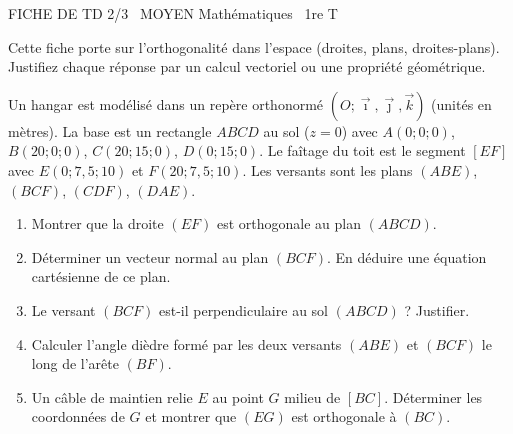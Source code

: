 \documentclass[11pt]{article}
\begin{document}
\begin{tcolorbox}[enhanced,colback=popink,colframe=popink,arc=10pt,boxrule=0pt,left=12pt,right=12pt,top=9pt,bottom=9pt]
{\color{white}\popxbold\small FICHE DE TD 2/3 \textbullet\ MOYEN \hfill Mathématiques \textbullet\ 1re T\par}
\end{tcolorbox}
\vspace{4pt}
Cette fiche porte sur l'orthogonalité dans l'espace (droites, plans, droites-plans). Justifiez chaque réponse par un calcul vectoriel ou une propriété géométrique.

\begin{exercice}
Un hangar est modélisé dans un repère orthonormé $(O;\vec\imath,\vec\jmath,\vec k)$ (unités en mètres). 
La base est un rectangle $ABCD$ au sol ($z=0$) avec $A(0;0;0)$, $B(20;0;0)$, $C(20;15;0)$, $D(0;15;0)$. 
Le faîtage du toit est le segment $[EF]$ avec $E(0;7,5;10)$ et $F(20;7,5;10)$. 
Les versants sont les plans $(ABE)$, $(BCF)$, $(CDF)$, $(DAE)$.
\begin{enumerate}
    \item Montrer que la droite $(EF)$ est orthogonale au plan $(ABCD)$.
    \item Déterminer un vecteur normal au plan $(BCF)$. En déduire une équation cartésienne de ce plan.
    \item Le versant $(BCF)$ est-il perpendiculaire au sol $(ABCD)$ ? Justifier.
    \item Calculer l'angle dièdre formé par les deux versants $(ABE)$ et $(BCF)$ le long de l'arête $(BF)$. 
    \item Un câble de maintien relie $E$ au point $G$ milieu de $[BC]$. Déterminer les coordonnées de $G$ et montrer que $(EG)$ est orthogonale à $(BC)$.
\end{enumerate}
\end{exercice}
\end{document}
